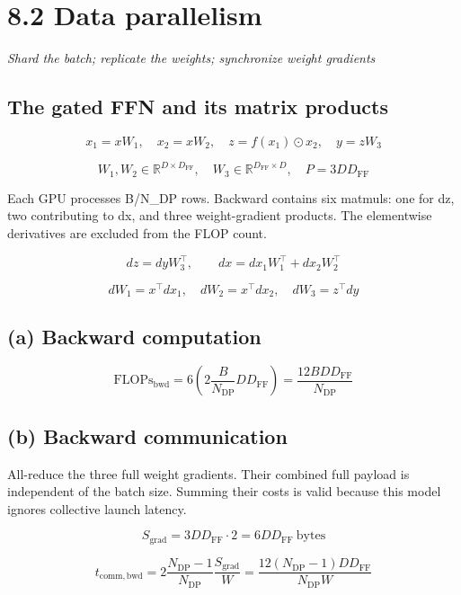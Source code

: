 \documentclass[10pt,a4paper]{article}
\begin{document}
\clearpage

\section*{8.2 \textperiodcentered{} Data parallelism}

\textit{Shard the batch; replicate the weights; synchronize weight gradients}\par

\subsection*{The gated FFN and its matrix products}

\[x_1=xW_1,\quad x_2=xW_2,\quad z=f(x_1)\odot x_2,\quad y=zW_3\]

\[W_1,W_2\in\mathbb{R}^{D\times D_{\mathrm{FF}}},\quad W_3\in\mathbb{R}^{D_{\mathrm{FF}}\times D},\quad P=3DD_{\mathrm{FF}}\]

Each GPU processes B/N\_DP rows. Backward contains six matmuls: one for dz, two contributing to dx, and three weight-gradient products. The elementwise derivatives are excluded from the FLOP count.\par

\[dz=dyW_3^\top,\qquad dx=dx_1W_1^\top+dx_2W_2^\top\]

\[dW_1=x^\top dx_1,\quad dW_2=x^\top dx_2,\quad dW_3=z^\top dy\]

\subsection*{(a) Backward computation}

\[\boxed{\mathrm{FLOPs}_{\mathrm{bwd}}=6\left(2\frac{B}{N_{\mathrm{DP}}}DD_{\mathrm{FF}}\right)=\frac{12BDD_{\mathrm{FF}}}{N_{\mathrm{DP}}}}\]

\subsection*{(b) Backward communication}

All-reduce the three full weight gradients. Their combined full payload is independent of the batch size. Summing their costs is valid because this model ignores collective launch latency.\par

\[S_{\mathrm{grad}}=3DD_{\mathrm{FF}}\cdot 2=6DD_{\mathrm{FF}}\ \mathrm{bytes}\]

\[\boxed{t_{\mathrm{comm,bwd}}=2\frac{N_{\mathrm{DP}}-1}{N_{\mathrm{DP}}}\frac{S_{\mathrm{grad}}}{W}=\frac{12(N_{\mathrm{DP}}-1)DD_{\mathrm{FF}}}{N_{\mathrm{DP}}W}}\]
\end{document}
